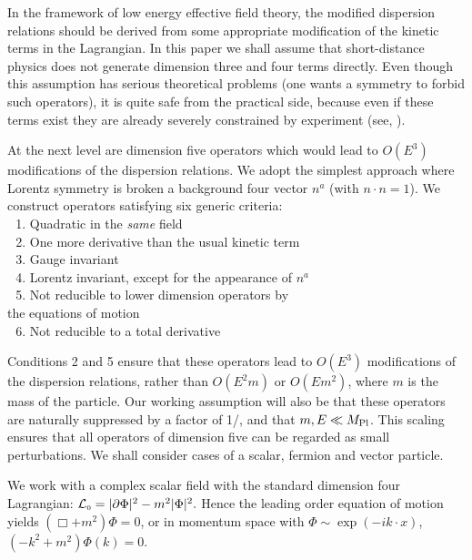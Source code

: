 In the framework of low energy effective field theory, the
modified dispersion relations should be derived from some
appropriate modification of the kinetic terms in the Lagrangian.
In this paper we shall assume that short-distance physics does not
generate dimension three and four terms directly. Even though this
assumption has serious theoretical problems (\eg one wants a
symmetry to forbid such operators), it is quite safe from the
practical side, because even if these terms exist they are already
severely constrained by experiment (see, \eg \cite{Kost}).


At the next level are dimension five operators which would lead to
$O(E^3)$ modifications of the dispersion relations. We adopt the
simplest approach where Lorentz symmetry is broken a background
four vector $n^a$ (with $n\cdot n=1$). We construct operators
satisfying six generic criteria:\\
$~~~$1. Quadratic in the {\em same} field\\
$~~~$2. One more derivative than the usual kinetic term\\
$~~~$3. Gauge invariant\\
$~~~$4. Lorentz invariant, except for the appearance of $n^a$\\
$~~~$5. Not reducible to lower dimension operators by \\\phantom{$~~~~~$}
 the equations of motion\\
$~~~$6. Not reducible to a total derivative



Conditions 2 and 5 ensure that these operators lead to $O(E^3)$
modifications of the dispersion relations, rather than $O(E^2m)$
or $O(Em^2)$, where $m$ is the mass of the particle. Our working
assumption will also be that these operators are naturally
suppressed by a factor of 1/\Mpl, and that $m,E \ll M_{\rm
Pl}$. This scaling ensures that all operators of dimension five
can be regarded as small perturbations. We shall consider cases of
a scalar, fermion and vector particle.

 We work with a complex scalar field with
the standard dimension four Lagrangian: $ {\cal L}_{\scriptscriptstyle 0} =
|\partial\Phi|^2-m^2|\Phi|^2.$ Hence the leading order equation of
motion yields $(\Box+m^2)\Phi=0$, or in momentum space with
$\Phi\sim\exp(-ik\cdot x)$, $(-k^2+m^2)\Phi(k)=0$.

